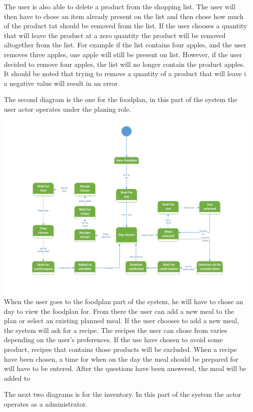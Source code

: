 The user is also able to delete a product from the shopping list. The user will then have to chose an item already present on the list and then chose how much of the product tat should be removed from the list. If the user chooses a quantity that will leave the product at a zero quantity the product will be removed altogether from the list. For example if the list contains four apples, and the user removes three apples, one apple will still be present on list. However, if the user decided to remove four apples, the list will no longer contain the product apples. It should be noted that trying to remove a quantity of a product that will leave i a negative value will result in an error.


The second diagram is the one for the foodplan, in this part of the system the user actor operates under the planing role.

\includegraphics[width=1.0\textwidth]{ApplicationDomain/spViewFoodPlan.pdf} \label{Foodplan_Figure}
When the user goes to the foodplan part of the system, he will have to chose an day to view the foodplan for. From there the user can add a new meal to the plan or select an existing planned meal. If the user chooses to add a new meal, the system will ask for a recipe. The recipes the user can chose from varies depending on the user's preferences. If the use have chosen to avoid some product, recipes that contains those products will be excluded. When a recipe have been chosen, a time for when on the day the meal should be prepared for will have to be entered. After the questions have been answered, the meal will be added to 


The next two diagrams is for the inventory. In this part of the system the actor operates as a administrator.

